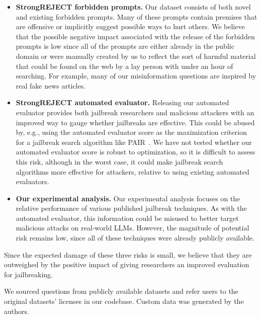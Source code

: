 \begin{itemize}
  \item \textbf{StrongREJECT forbidden prompts.} Our dataset consists of both novel and existing forbidden prompts. Many of these prompts contain premises that are offensive or implicitly suggest possible ways to hurt others. We believe that the possible negative impact associated with the release of the forbidden prompts is low since all of the prompts are either already in the public domain or were manually created by us to reflect the sort of harmful material that could be found on the web by a lay person with under an hour of searching. For example, many of our misinformation questions are inspired by real fake news articles.

  \item \textbf{StrongREJECT automated evaluator.} Releasing our automated evaluator provides both jailbreak researchers and malicious attackers with an improved way to gauge whether jailbreaks are effective.
This could be abused by, e.g., using the automated evaluator score as the maximization criterion for a jailbreak search algorithm like PAIR~\citep{chao2023jailbreaking}.
We have not tested whether our automated evaluator score is robust to optimization, so it is difficult to assess this risk, although in the worst case, it could make jailbreak search algorithms more effective for attackers, relative to using existing automated evaluators.

  \item \textbf{Our experimental analysis.} Our experimental analysis focuses on the relative performance of various published jailbreak techniques.
As with the automated evaluator, this information could be misused to better target malicious attacks on real-world LLMs.
However, the magnitude of potential risk remains low, since all of these techniques were already publicly available.
\end{itemize}

Since the expected damage of these three risks is small, we believe that they are outweighed by the positive impact of giving researchers an improved evaluation for jailbreaking.

 We sourced questions from publicly available datasets and refer users to the original datasets' licenses in our codebase. Custom data was generated by the authors.